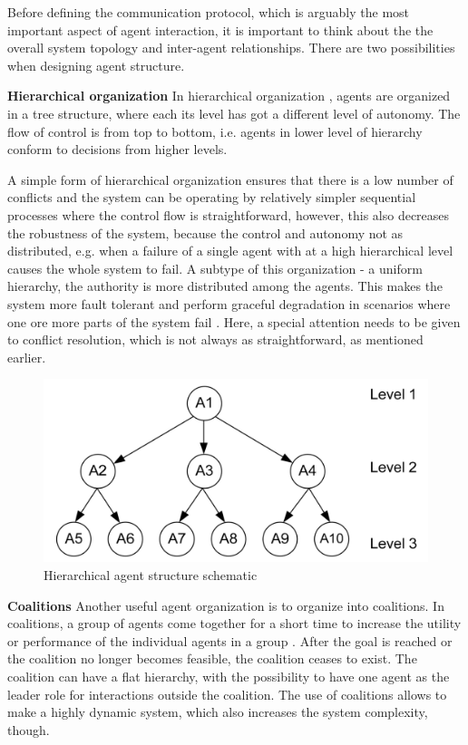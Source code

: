 \documentclass[main.tex]{subfiles}
\begin{document}
Before defining the communication protocol, which is arguably the most important aspect of agent 
interaction, it is important to think about the the overall system topology and inter-agent 
relationships. There are two possibilities when designing agent structure.

\textbf{Hierarchical organization}\newline
In hierarchical organization \cite{Damba2007}, agents are organized in a tree structure,
where each its level has got a different level of autonomy. The flow of control is 
from top to bottom, i.e. agents in lower level of hierarchy conform to decisions 
from higher levels. 

A simple form of hierarchical organization ensures that there is a low number of conflicts and
the system can be operating by relatively simpler sequential processes where the control flow
is straightforward, however, this also decreases the robustness of the system, because the
control and autonomy not as distributed, e.g. when a failure of a single agent with at a high
hierarchical level causes the whole system to fail. A subtype of this organization - a 
uniform hierarchy, the authority is more distributed among the agents. This makes the
system more fault tolerant and perform graceful degradation in scenarios where one ore more
parts of the system fail \cite{ParasumannaGokulan2010}. Here, a special attention needs to be
given to conflict resolution, which is not always as straightforward, as mentioned earlier. 

\begin{figure}[htbp]
    \centering
    \includegraphics[width=.6\textwidth]{hierarchy.png}
    \caption{Hierarchical agent structure schematic \cite{ParasumannaGokulan2010}}
    \label{hierarchy}
\end{figure}

\textbf{Coalitions}\newline
Another useful agent organization is to organize into coalitions. In coalitions, a group of
agents come together for a short time to increase the utility or performance of the individual
agents in a group \cite{ParasumannaGokulan2010}. After the goal is reached or the coalition no 
longer becomes feasible, the coalition ceases to exist. The coalition can have a flat hierarchy, 
with the possibility to have one agent as the leader role for interactions outside the coalition. 
The use of coalitions allows to make a highly dynamic system, which also increases the system 
complexity, though. 
\end{document}
